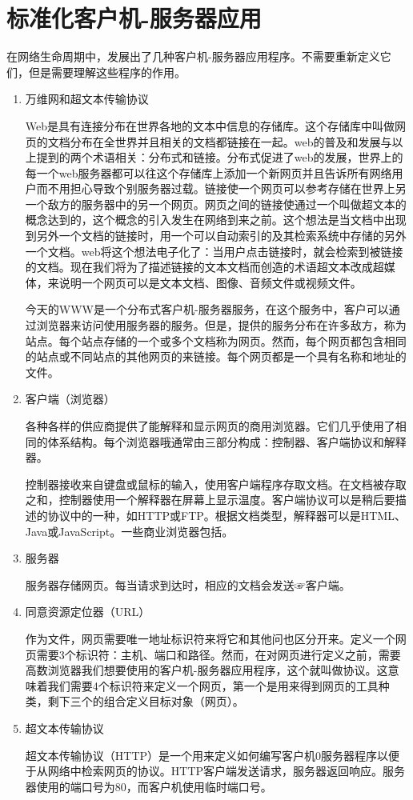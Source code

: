 \section{标准化客户机-服务器应用}
在网络生命周期中，发展出了几种客户机-服务器应用程序。不需要重新定义它们，但是需要理解这些程序的作用。
\begin{enumerate}
	\item 万维网和超文本传输协议

		Web是具有连接分布在世界各地的文本中信息的存储库。这个存储库中叫做网页的文档分布在全世界并且相关的文档都链接在一起。web的普及和发展与以上提到的两个术语相关：分布式和链接。分布式促进了web的发展，世界上的每一个web服务器都可以往这个存储库上添加一个新网页并且告诉所有网络用户而不用担心导致个别服务器过载。链接使一个网页可以参考存储在世界上另一个敌方的服务器中的另一个网页。网页之间的链接使通过一个叫做超文本的概念达到的，这个概念的引入发生在网络到来之前。这个想法是当文档中出现到另外一个文档的链接时，用一个可以自动索引的及其检索系统中存储的另外一个文档。web将这个想法电子化了：当用户点击链接时，就会检索到被链接的文档。现在我们将为了描述链接的文本文档而创造的术语超文本改成超媒体，来说明一个网页可以是文本文档、图像、音频文件或视频文件。

		今天的WWW是一个分布式客户机-服务器服务，在这个服务中，客户可以通过浏览器来访问使用服务器的服务。但是，提供的服务分布在许多敌方，称为站点。每个站点存储的一个或多个文档称为网页。然而，每个网页都包含相同的站点或不同站点的其他网页的来链接。每个网页都是一个具有名称和地址的文件。
	\item 客户端（浏览器）

		各种各样的供应商提供了能解释和显示网页的商用浏览器。它们几乎使用了相同的体系结构。每个浏览器哦通常由三部分构成：控制器、客户端协议和解释器。

		控制器接收来自键盘或鼠标的输入，使用客户端程序存取文档。在文档被存取之和，控制器使用一个解释器在屏幕上显示温度。客户端协议可以是稍后要描述的协议中的一种，如HTTP或FTP。根据文档类型，解释器可以是HTML、Java或JavaScript。一些商业浏览器包括。
	\item 服务器

		服务器存储网页。每当请求到达时，相应的文档会发送☞客户端。
	\item 同意资源定位器（URL）

		作为文件，网页需要唯一地址标识符来将它和其他问也区分开来。定义一个网页需要3个标识符：主机、端口和路径。然而，在对网页进行定义之前，需要高数浏览器我们想要使用的客户机-服务器应用程序，这个就叫做协议。这意味着我们需要4个标识符来定义一个网页，第一个是用来得到网页的工具种类，剩下三个的组合定义目标对象（网页）。
	\item 超文本传输协议

		超文本传输协议（HTTP）是一个用来定义如何编写客户机0服务器程序以便于从网络中检索网页的协议。HTTP客户端发送请求，服务器返回响应。服务器使用的端口号为80，而客户机使用临时端口号。
\end{enumerate}
